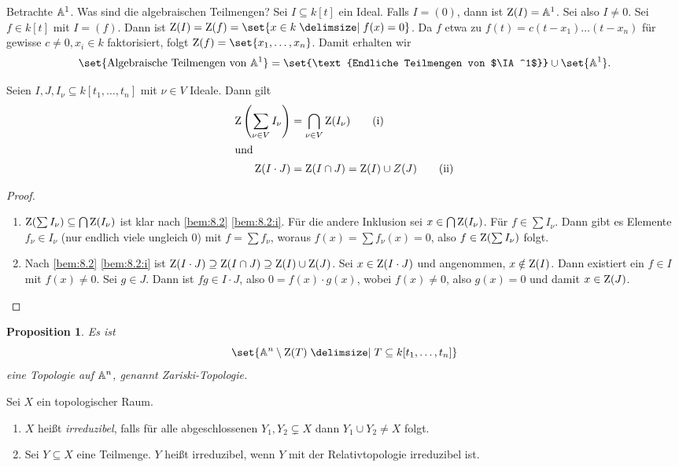 \documentclass[12pt,a4paper]{scrartcl}
\theoremstyle{cplain}
\newtheorem{prop}[thmcounter]{Proposition}
\theoremstyle{cdef}
\begin{document}
\begin{bsp} 
	Betrachte $\mathbb A^1$. Was sind die algebraischen Teilmengen? Sei $I\subseteq k[t]$ ein Ideal. Falls $I = (0)$, dann ist $\operatorname{Z}(I) = \mathbb A^1$. Sei also $I\neq 0$. Sei $f\in k[t]$ mit $I = (f)$. Dann ist $\Z(I) = \Z(f) = \set{x\in k\given f(x) = 0}$. Da $f$ etwa zu $f(t) = c(t-x_1)\dots (t-x_n)$ für gewisse $c \neq 0, x_i\in k$ faktorisiert, folgt $\Z(f) = \set{x_1,\dots, x_n}$. Damit erhalten wir
	\[\set{\text{Algebraische Teilmengen von }\IA^1} = \set{\text{Endliche Teilmengen von $\IA^1$}}\cup \set{\IA^1}.\]
\end{bsp}
\begin{lem} \label{lem:8.5}
	Seien $I,J, I_{\nu}\subseteq k[t_1,\dots, t_n]$ mit $\nu\in V$ Ideale. Dann gilt
	\begin{align*}
		\operatorname{Z}\left(\sum_{\nu\in V} I_{\nu}\right) &= \bigcap_{\nu\in V} \operatorname{Z}(I_{\nu}) \tag{i}\label{lem:8.5:i} \\\intertext{und}
		\operatorname{Z}(I\cdot J) &= \operatorname{Z}(I\cap J) = \operatorname{Z}(I)\cup Z(J) \tag{ii}\label{lem:8.5:ii}
	\end{align*}
\end{lem}
\begin{proof}
	\leavevmode
	\begin{enumerate}[label=\eqref{lem:8.5:\roman*}]
		\item $\operatorname{Z}(\sum I_{\nu}) \subseteq \bigcap \operatorname{Z}(I_{\nu})$ ist klar nach \cref{bem:8.2} \ref{bem:8.2:i}. Für die andere Inklusion sei $x\in\bigcap \operatorname{Z}(I_{\nu})$. Für $f\in\sum I_{\nu}$. Dann gibt es Elemente $f_{\nu}\in I_{\nu}$ (nur endlich viele ungleich $0$) mit $f = \sum f_{\nu}$, woraus $f(x) = \sum f_{\nu}(x) = 0$, also $f\in \operatorname{Z}(\sum I_{\nu})$ folgt.
		\item Nach \cref{bem:8.2} \ref{bem:8.2:i} ist $\operatorname{Z}(I\cdot J) \supseteq \operatorname{Z}(I\cap J)\supseteq \operatorname{Z}(I)\cup \operatorname{Z}(J)$. Sei $x\in \operatorname{Z}(I\cdot J)$ und angenommen, $x\notin \operatorname{Z}(I)$. Dann existiert ein $f\in I$ mit $f(x) \neq 0$. Sei $g\in J$. Dann ist $fg\in I\cdot J$, also $0 = f(x)\cdot g(x)$, wobei $f(x)\neq 0$, also $g(x) = 0$ und damit $x \in \operatorname{Z}(J)$.
		\qedhere
	\end{enumerate}
\end{proof}
\begin{prop} Es ist
	\[\set{\IA^n\setminus \Z(T)\given T\subseteq k[t_1,\dots, t_n]}\]
	eine Topologie auf $\mathbb A^n$, genannt \emph{Zariski-Topologie}.
\end{prop}
\begin{defi}
	Sei $X$ ein topologischer Raum.
	\begin{enumerate}
		\item $X$ heißt \emph{irreduzibel}, falls für alle abgeschlossenen $Y_1, Y_2\subsetneq X$ dann $Y_1\cup Y_2 \neq X$ folgt.
		\item Sei $Y\subseteq X$ eine Teilmenge. $Y$ heißt irreduzibel, wenn $Y$ mit der Relativtopologie irreduzibel ist. 
	\end{enumerate}
\end{defi}
\end{document}
